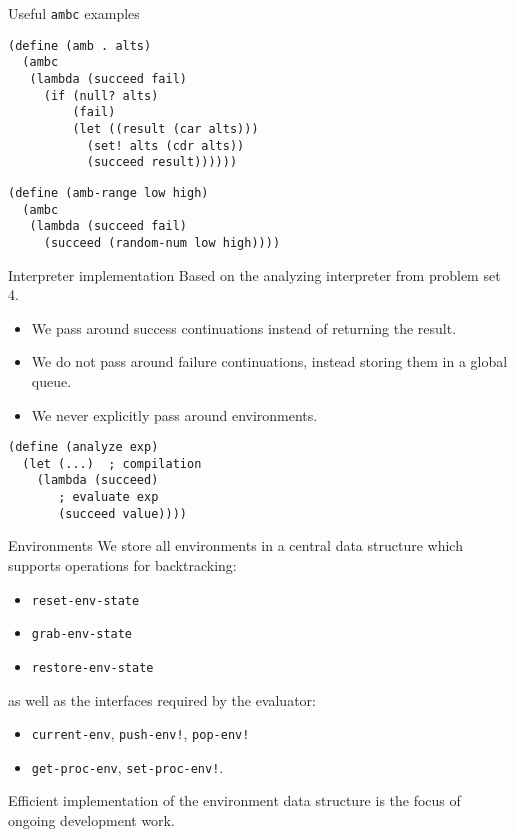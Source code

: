 \documentclass[14pt]{beamer}
\begin{document}
\begin{frame}[fragile]{Useful \texttt{ambc} examples}
  \begin{lstlisting}
(define (amb . alts)
  (ambc
   (lambda (succeed fail)
     (if (null? alts)
         (fail)
         (let ((result (car alts)))
           (set! alts (cdr alts))
           (succeed result))))))
  \end{lstlisting}
\pause
  \begin{lstlisting}
(define (amb-range low high)
  (ambc
   (lambda (succeed fail)
     (succeed (random-num low high))))
  \end{lstlisting}
\end{frame}

\begin{frame}[fragile]{Interpreter implementation}
  Based on the analyzing interpreter from problem set 4. \pause
  \begin{itemize}
  \item We pass around success continuations instead of returning the
    result. \pause
  \item We do not pass around failure continuations, instead storing
    them in a global queue. \pause
  \item We never explicitly pass around environments. \pause
  \end{itemize}
  \begin{lstlisting}
(define (analyze exp)
  (let (...)  ; compilation
    (lambda (succeed)
       ; evaluate exp
       (succeed value))))
  \end{lstlisting}
\end{frame}

\begin{frame}[fragile]{Environments}
  We store all environments in a central data structure which supports
  operations for backtracking:
  \begin{itemize}
  \item \texttt{reset-env-state}
  \item \texttt{grab-env-state}
  \item \texttt{restore-env-state}
  \end{itemize} \pause
  as well as the interfaces required by the evaluator:
  \begin{itemize}
    \item \texttt{current-env}, \texttt{push-env!}, \texttt{pop-env!}
    \item \texttt{get-proc-env}, \texttt{set-proc-env!}.
  \end{itemize} \pause
  \vfill Efficient implementation of the environment data structure is the
  focus of ongoing development work.
\end{frame}
\end{document}

